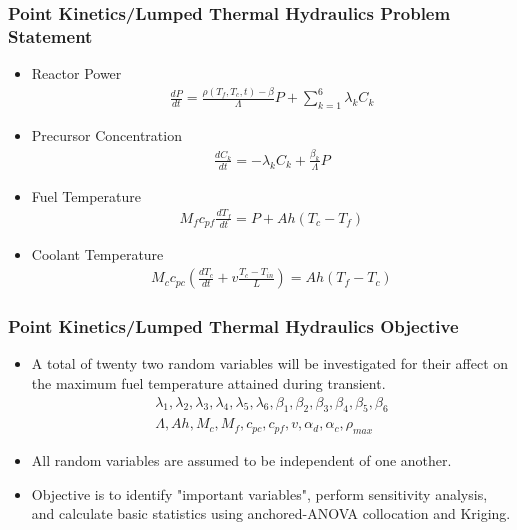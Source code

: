 \documentclass{beamer}
\begin{document}
\begin{frame}
\frametitle{Point Kinetics/Lumped Thermal Hydraulics Problem Statement}

\begin{itemize}
  \item Reactor Power
\begin{align*}
 \frac{dP}{dt} = \frac{\rho(T_f,T_c,t)-\beta}{\Lambda}P +
  \sum_{k=1}^6 \lambda_k C_k 
\end{align*}
  \item Precursor Concentration
\begin{align*}
 \frac{dC_k}{dt} = -\lambda_k C_k +
  \frac{\beta_k}{\Lambda}P
\end{align*}
  \item Fuel Temperature
\begin{align*}
  M_f c_{pf}\frac{dT_f}{dt} = P + Ah(T_c-T_f)
\end{align*} 
  \item Coolant Temperature
\begin{align*}
 M_c c_{pc}\left(\frac{dT_c}{dt} +v \frac{T_c - T_{in}}{L}\right) = 
  Ah(T_f-T_c)
\end{align*} 
\end{itemize}

\end{frame}
\begin{frame}
\frametitle{Point Kinetics/Lumped Thermal Hydraulics Objective}

\begin{itemize}
  \item A total of twenty two random variables will be investigated for their affect on the maximum fuel temperature attained during transient.
\begin{align*}
 \lambda_1, \lambda_2, \lambda_3, \lambda_4, \lambda_5, \lambda_6, \beta_1, \beta_2, \beta_3, \beta_4, \beta_5, \beta_6 \\
 \Lambda, Ah, M_c, M_f, c_{pc}, c_{pf}, v, \alpha_d, \alpha_c, \rho_{max}
\end{align*}
  \item All random variables are assumed to be independent of one another. 
  \item Objective is to identify "important variables", perform sensitivity analysis, and calculate basic statistics using anchored-ANOVA collocation and Kriging. 
\end{itemize}

\end{frame}
\end{document}
